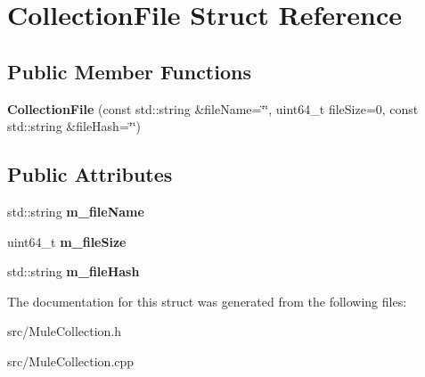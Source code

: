 \section{CollectionFile Struct Reference}
\label{structCollectionFile}
\subsection*{Public Member Functions}
\begin{DoxyCompactItemize}
\item 
{\bfseries CollectionFile} (const std::string \&fileName=\char`\"{}\char`\"{}, uint64\_\-t fileSize=0, const std::string \&fileHash=\char`\"{}\char`\"{})\label{structCollectionFile_a4928acd330af73b187235b55095897e0}

\end{DoxyCompactItemize}
\subsection*{Public Attributes}
\begin{DoxyCompactItemize}
\item 
std::string {\bfseries m\_\-fileName}\label{structCollectionFile_a29d5e17ac0ef596a3a7eb719707f082a}

\item 
uint64\_\-t {\bfseries m\_\-fileSize}\label{structCollectionFile_a6d4b04938b57114edc5bc647172f0cc8}

\item 
std::string {\bfseries m\_\-fileHash}\label{structCollectionFile_a32ceb26f06ebc5f410ad48c69b51ea25}

\end{DoxyCompactItemize}


The documentation for this struct was generated from the following files:\begin{DoxyCompactItemize}
\item 
src/MuleCollection.h\item 
src/MuleCollection.cpp\end{DoxyCompactItemize}
